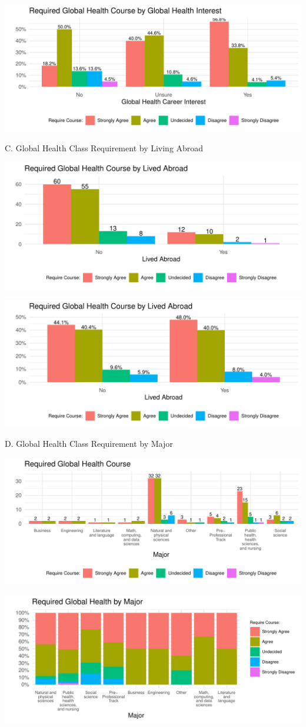 \documentclass[
  letterpaper,
  DIV=11,
  numbers=noendperiod]{scrartcl}
\begin{document}
\includegraphics{GlobalHealthQuarto1-5_files/figure-pdf/unnamed-chunk-42-1.pdf}

\newpage

C. Global Health Class Requirement by Living Abroad

\includegraphics{GlobalHealthQuarto1-5_files/figure-pdf/unnamed-chunk-43-1.pdf}

\includegraphics{GlobalHealthQuarto1-5_files/figure-pdf/unnamed-chunk-44-1.pdf}

\newpage

D. Global Health Class Requirement by Major

\includegraphics{GlobalHealthQuarto1-5_files/figure-pdf/unnamed-chunk-45-1.pdf}

\includegraphics{GlobalHealthQuarto1-5_files/figure-pdf/unnamed-chunk-46-1.pdf}
\end{document}
